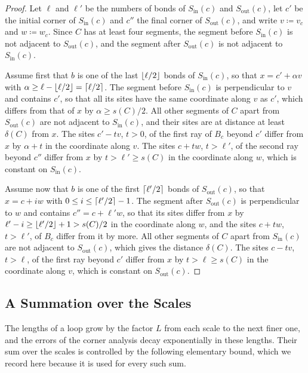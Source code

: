 \documentclass[11pt]{preprint}
\DeclarePairedDelimiter{\floor}{\lfloor}{\rfloor}
\DeclarePairedDelimiter{\ceil}{\lceil}{\rceil}
\numberwithin{equation}{section}
\theoremstyle{definition}
\theoremstyle{remark}
\theoremstyle{plain}
\begin{document}
\begin{proof}
Let $\ell$ and $\ell'$ be the numbers of bonds of $S_{\mathrm{in}}(c)$ and $S_{\mathrm{out}}(c)$, let $c'$ be the initial corner of $S_{\mathrm{in}}(c)$ and $c''$ the final corner of $S_{\mathrm{out}}(c)$, and write $v \coloneqq v_c$ and $w \coloneqq w_c$. Since $C$ has at least four segments, the segment before $S_{\mathrm{in}}(c)$ is not adjacent to $S_{\mathrm{out}}(c)$, and the segment after $S_{\mathrm{out}}(c)$ is not adjacent to $S_{\mathrm{in}}(c)$.

Assume first that $b$ is one of the last $\floor{\ell/2}$ bonds of $S_{\mathrm{in}}(c)$, so that $x = c' + \alpha v$ with $\alpha \geq \ell - \floor{\ell/2} = \ceil{\ell/2}$. The segment before $S_{\mathrm{in}}(c)$ is perpendicular to $v$ and contains $c'$, so that all its sites have the same coordinate along $v$ as $c'$, which differs from that of $x$ by $\alpha \geq s(C)/2$. All other segments of $C$ apart from $S_{\mathrm{out}}(c)$ are not adjacent to $S_{\mathrm{in}}(c)$, and their sites are at distance at least $\delta(C)$ from $x$. The sites $c' - tv$, $t > 0$, of the first ray of $B_c$ beyond $c'$ differ from $x$ by $\alpha + t$ in the coordinate along $v$. The sites $c + tw$, $t > \ell'$, of the second ray beyond $c''$ differ from $x$ by $t > \ell' \geq s(C)$ in the coordinate along $w$, which is constant on $S_{\mathrm{in}}(c)$.

Assume now that $b$ is one of the first $\ceil{\ell'/2}$ bonds of $S_{\mathrm{out}}(c)$, so that $x = c + iw$ with $0 \leq i \leq \ceil{\ell'/2} - 1$. The segment after $S_{\mathrm{out}}(c)$ is perpendicular to $w$ and contains $c'' = c + \ell'w$, so that its sites differ from $x$ by $\ell' - i \geq \floor{\ell'/2} + 1 > s(C)/2$ in the coordinate along $w$, and the sites $c + tw$, $t > \ell'$, of $B_c$ differ from it by more. All other segments of $C$ apart from $S_{\mathrm{in}}(c)$ are not adjacent to $S_{\mathrm{out}}(c)$, which gives the distance $\delta(C)$. The sites $c - tv$, $t > \ell$, of the first ray beyond $c'$ differ from $x$ by $t > \ell \geq s(C)$ in the coordinate along $v$, which is constant on $S_{\mathrm{out}}(c)$.
\end{proof}

\subsection{A Summation over the Scales}\label{sec:scale-sums}

The lengths of a loop grow by the factor $L$ from each scale to the next finer one, and the errors of the corner analysis decay exponentially in these lengths. Their sum over the scales is controlled by the following elementary bound, which we record here because it is used for every such sum.
\end{document}
